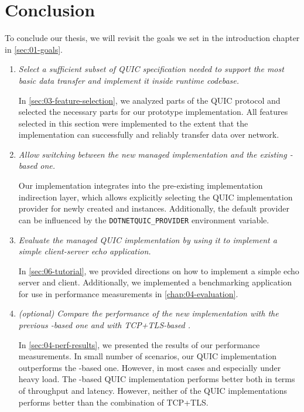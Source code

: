 \chapter*{Conclusion}

To conclude our thesis, we will revisit the goals we set in the introduction chapter in
\autoref{sec:01-goals}.

\begin{enumerate}

  \item \textit{Select a sufficient subset of QUIC specification needed to support the most basic data
        transfer and implement it inside \dotnet{} runtime codebase.}

        In \autoref{sec:03-feature-selection}, we analyzed parts of the QUIC protocol and selected
        the necessary parts for our prototype implementation. All features selected in this section
        were implemented to the extent that the implementation can successfully and reliably
        transfer data over network.

  \item \textit{Allow switching between the new managed implementation and the existing \libmsquic{}-based one.}

        Our implementation integrates into the pre-existing implementation indirection layer, which
        allows explicitly selecting the QUIC implementation provider for newly created
        \QuicListener{} and \QuicConnection{} instances. Additionally, the default provider can be
        influenced by the \texttt{DOTNETQUIC_PROVIDER} environment variable.

  \item \textit{Evaluate the managed QUIC implementation by using it to implement a simple client-server
echo application.}

        In \autoref{sec:06-tutorial}, we provided directions on how to implement a simple echo
        server and client. Additionally, we implemented a benchmarking application for use in
        performance measurements in \autoref{chap:04-evaluation}.

  \item \textit{(optional) Compare the performance of the new implementation with the
previous \libmsquic{}-based one and with TCP+TLS-based .}

        In \autoref{sec:04-perf-results}, we presented the results of our performance measurements.
        In small number of scenarios, our QUIC implementation outperforms the \libmsquic{}-based
        one. However, in most cases and especially under heavy load. The \libmsquic{}-based QUIC
        implementation performs better both in terms of throughput and latency. However, neither of
        the QUIC implementations performs better than the combination of TCP+TLS\@.

\end{enumerate}

